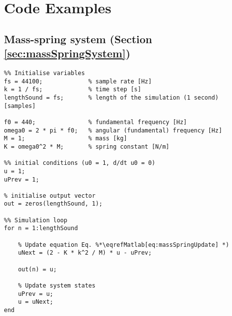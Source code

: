 \chapter{Code Examples}

\section{Mass-spring system (Section \ref{sec:massSpringSystem})}\label{app:massSpringCode}

\setlstMAT
\begin{lstlisting}
%% Initialise variables
fs = 44100;             % sample rate [Hz]
k = 1 / fs;             % time step [s]
lengthSound = fs;       % length of the simulation (1 second) [samples]

f0 = 440;               % fundamental frequency [Hz]
omega0 = 2 * pi * f0;   % angular (fundamental) frequency [Hz]
M = 1;                  % mass [kg]
K = omega0^2 * M;       % spring constant [N/m]

%% initial conditions (u0 = 1, d/dt u0 = 0)
u = 1;                  
uPrev = 1;

% initialise output vector
out = zeros(lengthSound, 1);

%% Simulation loop
for n = 1:lengthSound
    
    % Update equation Eq. %*\eqrefMatlab[eq:massSpringUpdate] *)
    uNext = (2 - K * k^2 / M) * u - uPrev; 
    
    out(n) = u;
    
    % Update system states
    uPrev = u;
    u = uNext;
end    
\end{lstlisting}


